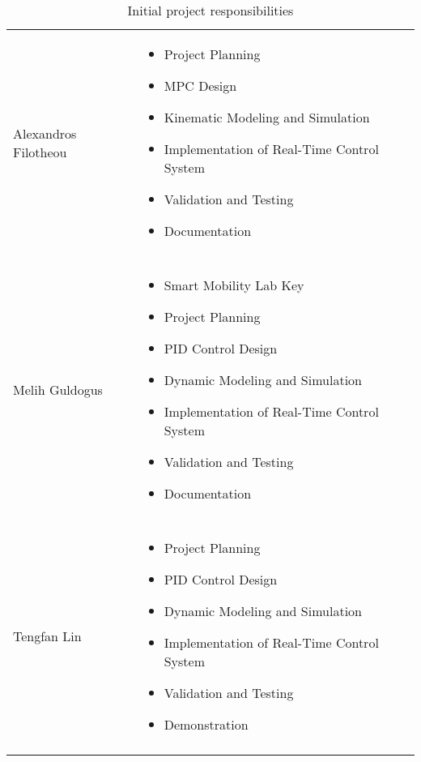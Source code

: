 \begin{table}[H]
    \begin{tabular}{l|l}
    Alexandros Filotheou             &
      \begin{minipage}[t]{\textwidth}
        \begin{itemize}
          \item Project Planning
          \item MPC Design
          \item Kinematic Modeling and Simulation
          \item Implementation of Real-Time Control System
          \item Validation and Testing
          \item Documentation
        \end{itemize}
      \end{minipage} \\ \\ \hline
    Melih Guldogus                   &
      \begin{minipage}[t]{\textwidth}
        \begin{itemize}
          \item Smart Mobility Lab Key
          \item Project Planning
          \item PID Control Design
          \item Dynamic Modeling and Simulation
          \item Implementation of Real-Time Control System
          \item Validation and Testing
          \item Documentation
        \end{itemize}
      \end{minipage} \\ \\ \hline
    Tengfan Lin                      &
      \begin{minipage}[t]{\textwidth}
        \begin{itemize}
          \item Project Planning
          \item PID Control Design
          \item Dynamic Modeling and Simulation
          \item Implementation of Real-Time Control System
          \item Validation and Testing
          \item Demonstration
        \end{itemize}
      \end{minipage} \\ \\ \hline
    \end{tabular}
    \caption{Initial project responsibilities}
    \label{tbl:responsibilities_1}
\end{table}

